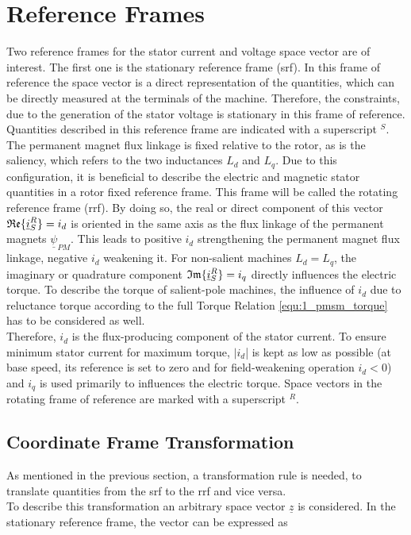 \section{Reference Frames} \label{sec:0_refframes}
Two reference frames for the stator current and voltage space vector are of interest. The first one is the stationary reference frame (\acrshort{srf}). In this frame of reference the space vector is a direct representation of the quantities, which can be directly measured at the terminals of the machine. Therefore, the constraints, due to the generation of the stator voltage is stationary in this frame of reference. Quantities described in this reference frame are indicated with a superscript $^S$.\\
The permanent magnet flux linkage is fixed relative to the rotor, as is the saliency, which refers to the two inductances $L_d$ and $L_q$. Due to this configuration, it is beneficial to describe the electric and magnetic stator quantities in a rotor fixed reference frame. This frame will be called the rotating reference frame (\acrshort{rrf}). By doing so, the real or direct component of this vector $\mathfrak{Re}\{\underline{i}_S^R\} = i_d$ is oriented in the same axis as the flux linkage of the permanent magnets $\underline{\psi}_{PM}$. This leads to positive $i_d$ strengthening the permanent magnet flux linkage, negative $i_d$ weakening it. For non-salient machines $L_d = L_q$, the imaginary or quadrature component $\mathfrak{Im}\{\underline{i}_S^R\} = i_q$ directly influences the electric torque. To describe the torque of salient-pole machines, the influence of $i_d$ due to reluctance torque according to the full Torque Relation \eqref{equ:1_pmsm_torque} has to be considered as well.\\
Therefore, $i_d$ is the flux-producing component of the stator current. To ensure minimum stator current for maximum torque, $|i_d$| is kept as low as possible (at base speed, its reference is set to zero and for field-weakening operation $i_d<0$) and $i_q$ is used primarily to influences the electric torque. Space vectors in the rotating frame of reference are marked with a superscript $^R$. 


\subsection{Coordinate Frame Transformation} \label{sec:0_coordtrans}
As mentioned in the previous section, a transformation rule is needed, to translate quantities from the \acrshort{srf} to the \acrshort{rrf} and vice versa.\\
To describe this transformation an arbitrary space vector $\underline{z}$ is considered. In the stationary reference frame, the vector can be expressed as

